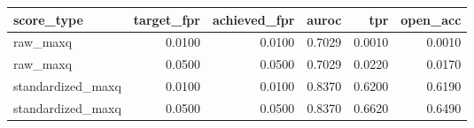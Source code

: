 \begin{tabular}{lrrrrr}
\toprule
score_type & target_fpr & achieved_fpr & auroc & tpr & open_acc \\
\midrule
raw_maxq & 0.0100 & 0.0100 & 0.7029 & 0.0010 & 0.0010 \\
raw_maxq & 0.0500 & 0.0500 & 0.7029 & 0.0220 & 0.0170 \\
standardized_maxq & 0.0100 & 0.0100 & 0.8370 & 0.6200 & 0.6190 \\
standardized_maxq & 0.0500 & 0.0500 & 0.8370 & 0.6620 & 0.6490 \\
\bottomrule
\end{tabular}
